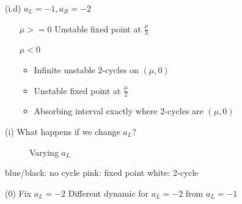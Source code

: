 \documentclass{beamer}
\newcounter{n}
\newcounter{f}
\begin{document}
\begin{frame}{(i.d) $a_L = -1, a_R = -2$}
    \begin{enumerate}
        \item[$\mu >= 0$] Unstable fixed point at $\frac{\mu}{3}$
        \item[$\mu < 0$] \begin{itemize}
            \item Infinite unstable 2-cycles on $(\mu, 0)$
            \item Unstable fixed point at $\frac{\mu}{2}$
            \item Absorbing interval exactly where 2-cycles are $(\mu, 0)$
        \end{itemize}
    \end{enumerate}
\end{frame}

\begin{frame}{(i) What happens if we change $a_L$?}
    \begin{figure}
        \centering
         \qquad
        \caption{Varying $a_L$}
    \end{figure}

    blue/black: no cycle
    \hspace*{\fill}
    pink: fixed point
    \hspace*{\fill}
    white: 2-cycle
\end{frame}

\begin{frame}{(0) Fix $a_L = -2$}
    Different dynamic for $a_L = -2$ from $a_L = -1$
\end{frame}
\end{document}
